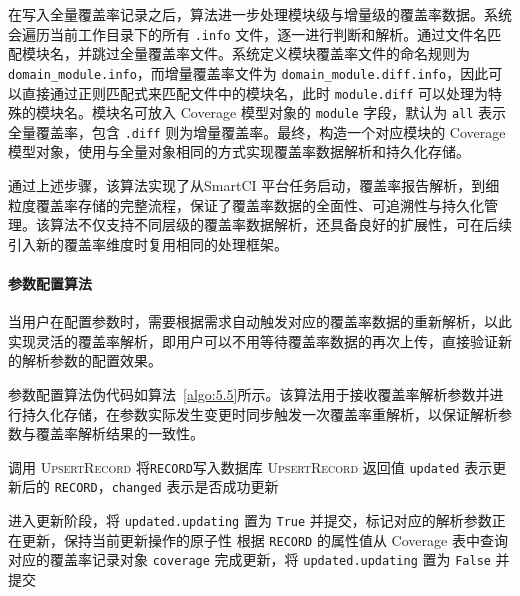 在写入全量覆盖率记录之后，算法进一步处理模块级与增量级的覆盖率数据。系统会遍历当前工作目录下的所有 \verb|.info| 文件，逐一进行判断和解析。通过文件名匹配模块名，并跳过全量覆盖率文件。系统定义模块覆盖率文件的命名规则为 \verb|domain_module.info|，而增量覆盖率文件为 \verb|domain_module.diff.info|，因此可以直接通过正则匹配式来匹配文件中的模块名，此时 \verb|module.diff| 可以处理为特殊的模块名。模块名可放入 Coverage 模型对象的 \verb|module| 字段，默认为 \verb|all| 表示全量覆盖率，包含 \verb|.diff| 则为增量覆盖率。最终，构造一个对应模块的 Coverage 模型对象，使用与全量对象相同的方式实现覆盖率数据解析和持久化存储。

通过上述步骤，该算法实现了从SmartCI 平台任务启动，覆盖率报告解析，到细粒度覆盖率存储的完整流程，保证了覆盖率数据的全面性、可追溯性与持久化管理。该算法不仅支持不同层级的覆盖率数据解析，还具备良好的扩展性，可在后续引入新的覆盖率维度时复用相同的处理框架。

\paragraph{\textbf{参数配置算法}}
当用户在配置参数时，需要根据需求自动触发对应的覆盖率数据的重新解析，以此实现灵活的覆盖率解析，即用户可以不用等待覆盖率数据的再次上传，直接验证新的解析参数的配置效果。

参数配置算法伪代码如算法~\ref{algo:5.5}所示。该算法用于接收覆盖率解析参数并进行持久化存储，在参数实际发生变更时同步触发一次覆盖率重解析，以保证解析参数与覆盖率解析结果的一致性。

\begin{algorithm}[ht]
\caption{细粒度分析-接口适配层-参数配置算法}
\label{algo:5.5}

调用 \textsc{UpsertRecord} 将\texttt{RECORD}写入数据库 
\textsc{UpsertRecord} 返回值 \texttt{updated} 表示更新后的 \texttt{RECORD}，\texttt{changed} 表示是否成功更新 \; 

进入更新阶段，将 \texttt{updated.updating} 置为 \texttt{True} 并提交，标记对应的解析参数正在更新，保持当前更新操作的原子性 \;
根据 \texttt{RECORD} 的属性值从 Coverage 表中查询对应的覆盖率记录对象 \texttt{coverage} \;
完成更新，将 \texttt{updated.updating} 置为 \texttt{False} 并提交 \;
\end{algorithm}

